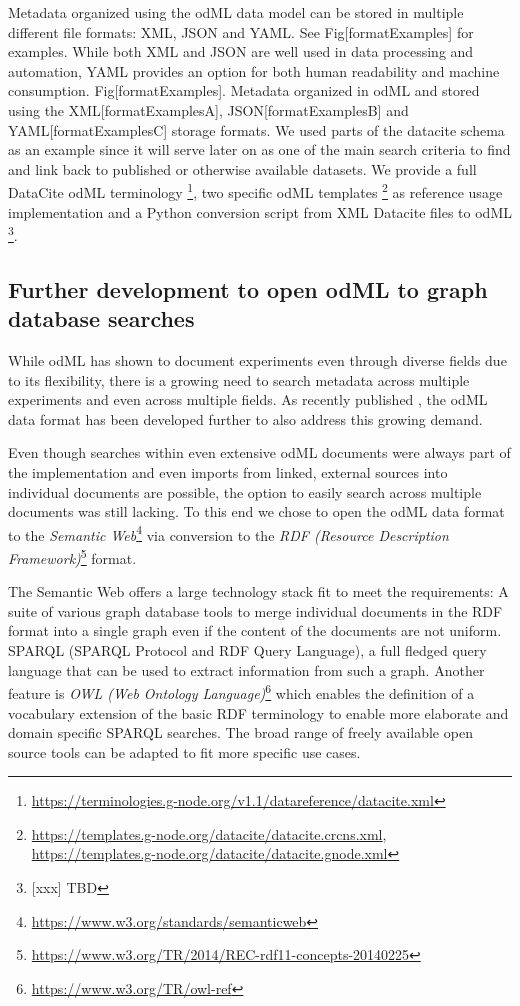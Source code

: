 \documentclass{article}
\begin{document}
Metadata organized using the odML data model can be stored in multiple different file formats: XML, JSON and YAML. See Fig[formatExamples] for examples. While both XML and JSON are well used in data processing and automation, YAML provides an option for both human readability and machine consumption.
Fig[formatExamples]. Metadata organized in odML and stored using the XML[formatExamplesA], JSON[formatExamplesB] and YAML[formatExamplesC] storage formats.
We used parts of the datacite schema as an example since it will serve later on as one of the main search criteria to find and link back to published or otherwise available datasets. We provide a full DataCite odML terminology \footnote{\url{https://terminologies.g-node.org/v1.1/datareference/datacite.xml}}, two specific odML templates \footnote{\url{https://templates.g-node.org/datacite/datacite.crcns.xml}, \url{https://templates.g-node.org/datacite/datacite.gnode.xml}} as reference usage implementation and a Python conversion script from XML Datacite files to odML \footnote{[xxx] TBD}.

\subsection{Further development to open odML to graph database searches} \label{sec::why_rdf}

While odML has shown to document experiments even through diverse fields due to its flexibility, there is a growing need to search metadata across multiple experiments and even across multiple fields. As recently published \cite{Sprenger_2019}, the odML data format has been developed further to also address this growing demand.

Even though searches within even extensive odML documents were always part of the implementation and even imports from linked, external sources into individual documents are possible, the option to easily search across multiple documents was still lacking. To this end we chose to open the odML data format to the \textit{Semantic Web}\footnote{\url{https://www.w3.org/standards/semanticweb}} via conversion to the \textit{RDF (Resource Description Framework)}\footnote{\url{https://www.w3.org/TR/2014/REC-rdf11-concepts-20140225}} format.


The Semantic Web offers a large technology stack fit to meet the requirements: A suite of various graph database tools to merge individual documents in the RDF format into a single graph even if the content of the documents are not uniform. SPARQL (SPARQL Protocol and RDF Query Language), a full fledged query language that can be used to extract information from such a graph. Another feature is \textit{OWL (Web Ontology Language)}\footnote{\url{https://www.w3.org/TR/owl-ref}} which enables the definition of a vocabulary extension of the basic RDF terminology to enable more elaborate and domain specific SPARQL searches. The broad range of freely available open source tools can be adapted to fit more specific use cases.
\end{document}

